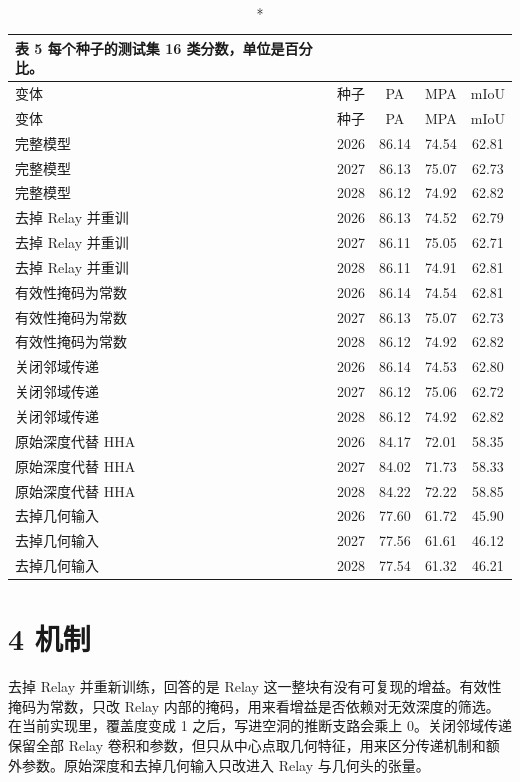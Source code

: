 \documentclass[11pt]{article}
\begin{document}
{\footnotesize\setlength{\tabcolsep}{3pt}
\begin{longtable}{lcccc}
\caption*{表 5  每个种子的测试集 16 类分数，单位是百分比。}\\
\toprule
变体 & 种子 & PA & MPA & mIoU\\
\midrule
\endfirsthead
\toprule
变体 & 种子 & PA & MPA & mIoU\\
\midrule
\endhead
完整模型 & 2026 & 86.14 & 74.54 & 62.81\\
完整模型 & 2027 & 86.13 & 75.07 & 62.73\\
完整模型 & 2028 & 86.12 & 74.92 & 62.82\\
去掉 Relay 并重训 & 2026 & 86.13 & 74.52 & 62.79\\
去掉 Relay 并重训 & 2027 & 86.11 & 75.05 & 62.71\\
去掉 Relay 并重训 & 2028 & 86.11 & 74.91 & 62.81\\
有效性掩码为常数 & 2026 & 86.14 & 74.54 & 62.81\\
有效性掩码为常数 & 2027 & 86.13 & 75.07 & 62.73\\
有效性掩码为常数 & 2028 & 86.12 & 74.92 & 62.82\\
关闭邻域传递 & 2026 & 86.14 & 74.53 & 62.80\\
关闭邻域传递 & 2027 & 86.12 & 75.06 & 62.72\\
关闭邻域传递 & 2028 & 86.12 & 74.92 & 62.82\\
原始深度代替 HHA & 2026 & 84.17 & 72.01 & 58.35\\
原始深度代替 HHA & 2027 & 84.02 & 71.73 & 58.33\\
原始深度代替 HHA & 2028 & 84.22 & 72.22 & 58.85\\
去掉几何输入 & 2026 & 77.60 & 61.72 & 45.90\\
去掉几何输入 & 2027 & 77.56 & 61.61 & 46.12\\
去掉几何输入 & 2028 & 77.54 & 61.32 & 46.21\\
\bottomrule
\end{longtable}}
\section*{4  机制}
去掉 Relay 并重新训练，回答的是 Relay 这一整块有没有可复现的增益。有效性掩码为常数，只改 Relay 内部的掩码，用来看增益是否依赖对无效深度的筛选。在当前实现里，覆盖度变成 1 之后，写进空洞的推断支路会乘上 0。关闭邻域传递保留全部 Relay 卷积和参数，但只从中心点取几何特征，用来区分传递机制和额外参数。原始深度和去掉几何输入只改进入 Relay 与几何头的张量。
\end{document}
